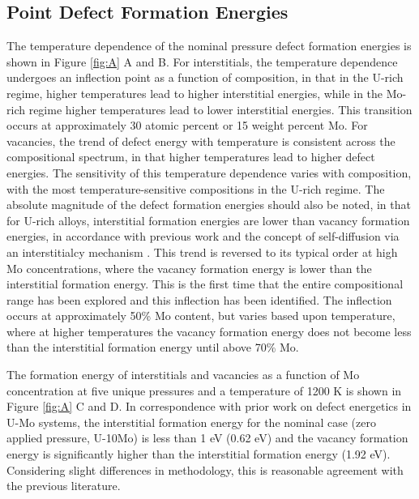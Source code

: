 \documentclass[default]{sn-jnl}%
\begin{document}
\subsection{Point Defect Formation Energies}
The temperature dependence of the nominal pressure defect formation energies is shown in Figure \ref{fig:A} A and B. For interstitials, the temperature dependence undergoes an inflection point as a function of composition, in that in the U-rich regime, higher temperatures lead to higher interstitial energies, while in the Mo-rich regime higher temperatures lead to lower interstitial energies. This transition occurs at approximately 30 atomic percent or 15 weight percent Mo. For vacancies, the trend of defect energy with temperature is consistent across the compositional spectrum, in that higher temperatures lead to higher defect energies. The sensitivity of this temperature dependence varies with composition, with the most temperature-sensitive compositions in the U-rich regime. The absolute magnitude of the defect formation energies should also be noted, in that for U-rich alloys, interstitial formation energies are lower than vacancy formation energies, in accordance with previous work \cite{beeler2010,beelerAIMD,smirnova2015,park2021} and the concept of self-diffusion via an interstitialcy mechanism \cite{park2021}. This trend is reversed to its typical order at high Mo concentrations, where the vacancy formation energy is lower than the interstitial formation energy. This is the first time that the entire compositional range has been explored and this inflection has been identified. The inflection occurs at approximately 50\% Mo content, but varies based upon temperature, where at higher temperatures the vacancy formation energy does not become less than the interstitial formation energy until above 70\% Mo. 

The formation energy of interstitials and vacancies as a function of Mo concentration at five unique pressures and a temperature of 1200 K is shown in Figure \ref{fig:A} C and D. In correspondence with prior work \cite{park2021} on defect energetics in U-Mo systems, the interstitial formation energy for the nominal case (zero applied pressure, U-10Mo) is less than 1 eV (0.62 eV) and the vacancy formation energy is significantly higher than the interstitial formation energy (1.92 eV). Considering slight differences in methodology, this is reasonable agreement with the previous literature. 
\end{document}
